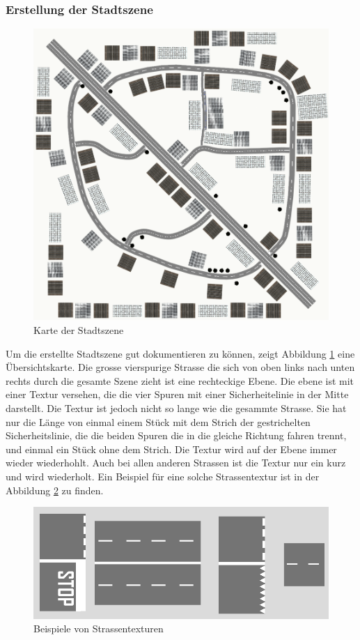 \subsubsection{Erstellung der Stadtszene}
\begin{figure}[htbp]
\centering 
\includegraphics[scale=0.3]{src/CityWorld_map.png}
\caption{Karte der Stadtszene} %
\label{CityWorld_map} %
\end{figure}
Um die erstellte Stadtszene gut dokumentieren zu können, zeigt Abbildung \ref{CityWorld_map} eine Übersichtskarte. Die grosse vierspurige Strasse die sich von oben links nach unten rechts durch die gesamte Szene zieht ist eine rechteckige Ebene. Die ebene ist mit einer Textur versehen, die die vier Spuren mit einer Sicherheitelinie in der Mitte darstellt. Die Textur ist jedoch nicht so lange wie die gesammte Strasse. Sie hat nur die Länge von einmal einem Stück mit dem Strich der gestrichelten Sicherheitslinie, die die beiden Spuren die in die gleiche Richtung fahren trennt, und einmal ein Stück ohne dem Strich. Die Textur wird auf der Ebene immer wieder wiederhohlt. Auch bei allen anderen Strassen ist die Textur nur ein kurz und wird wiederholt. Ein Beispiel für eine solche Strassentextur ist in der Abbildung \ref{examples_street_textures} zu finden. \\
\begin{figure}[htbp]
\centering 
\includegraphics[scale=0.6]{src/examples_street_textures.png}
\caption{Beispiele von Strassentexturen} %
\label{examples_street_textures} %
\end{figure}
